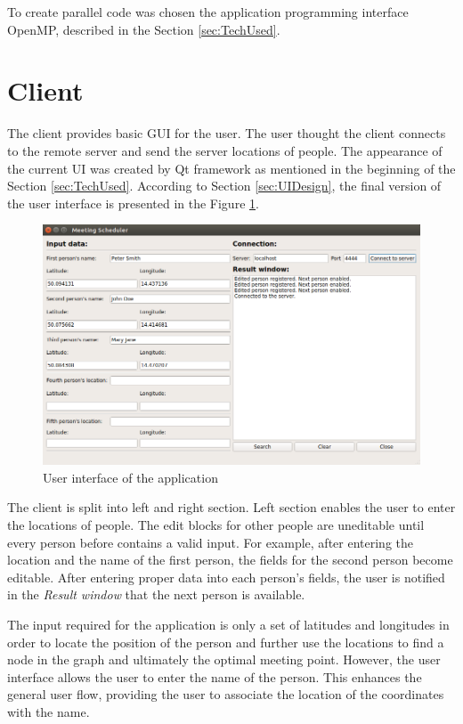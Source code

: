 \documentclass[thesis=M,english]{FITthesis}[2012/10/20]
\begin{document}
To create parallel code was chosen the application programming interface OpenMP, described in the Section \ref{sec:TechUsed}.

\newpage
\section{Client}
\label{sec:RClient}
The client provides basic GUI for the user. The user thought the client connects to the remote server and send the server locations of people.
The appearance of the current UI was created by Qt framework as mentioned in the beginning of the Section \ref{sec:TechUsed}. According to Section \ref{sec:UIDesign}, the final version of the user interface is presented in the Figure \ref{pic:UIFinal}.


\begin{figure}[H]
\centering
\includegraphics[width=1\textwidth]{pics/UIFinal}
\caption{User interface of the application}
\label{pic:UIFinal}
\end{figure}

The client is split into left and right section. Left section enables the user to enter the locations of people. The edit blocks for other people are uneditable until every person before contains a valid input. For example, after entering the location and the name of the first person, the fields for the second person become editable. After entering proper data into each person's fields, the user is notified in the \textit{Result window} that the next person is available. 

The input required for the application is only a set of latitudes and longitudes in order to locate the position of the person and further use the locations to find a node in the graph and ultimately the optimal meeting point. However, the user interface allows the user to enter the name of the person. This enhances the general user flow, providing the user to associate the location of the coordinates with the name.
\end{document}
